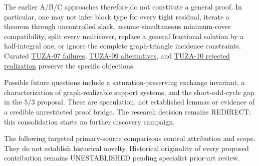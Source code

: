 \documentclass[11pt]{article}
\begin{document}
The earlier A/B/C approaches therefore do not constitute a general proof. In particular, one may not infer block type for every tight residual, iterate a theorem through uncontrolled slack, assume simultaneous minimum-cover compatibility, split every multicover, replace a general fractional solution by a half-integral one, or ignore the complete graph-triangle incidence constraints. Curated \href{https://github.com/pappa211/ai-math-experiments/blob/main/problems/TUZA-07/notes/COUNTEREXAMPLES_AND_FAILURES.md}{TUZA-07 failures}, \href{https://github.com/pappa211/ai-math-experiments/blob/main/problems/TUZA-09/notes/ALTERNATIVES.md}{TUZA-09 alternatives}, and \href{https://github.com/pappa211/ai-math-experiments/blob/main/problems/TUZA-10/notes/PROOFS_OR_OBSTRUCTIONS.md}{TUZA-10 rejected realization} preserve the specific objections.

Possible future questions include a saturation-preserving exchange invariant, a characterization of graph-realizable support systems, and the short-odd-cycle gap in the \(5/3\) proposal. These are speculation, not established lemmas or evidence of a credible unrestricted proof bridge. The research decision remains REDIRECT: this consolidation starts no further discovery campaign.

The following targeted primary-source comparisons control attribution and scope. They do not establish historical novelty. Historical originality of every proposed contribution remains UNESTABLISHED pending specialist prior-art review.
\end{document}

